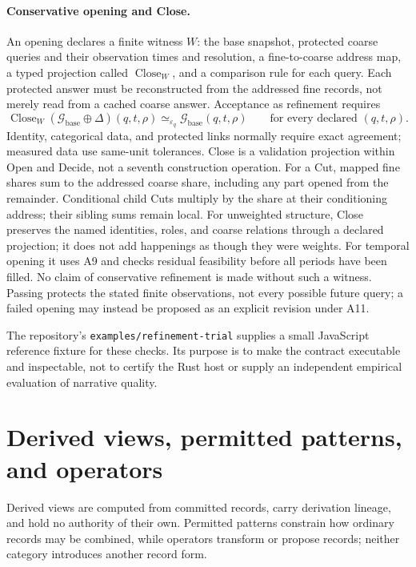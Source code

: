 \documentclass[11pt,a4paper]{article}
\begin{document}
\paragraph{Conservative opening and Close.}
An opening declares a finite witness $W$: the base snapshot, protected coarse
queries and their observation times and resolution, a fine-to-coarse address
map, a typed projection called $\operatorname{Close}_W$, and a comparison
rule for each query. Each protected answer must be reconstructed from the
addressed fine records, not merely read from a cached coarse answer.
Acceptance as refinement requires
\begin{equation}
  \operatorname{Close}_W(\mathcal G_{\mathrm{base}}\oplus\Delta)(q,t,\rho)
  \simeq_{\varepsilon_q}
  \mathcal G_{\mathrm{base}}(q,t,\rho)
  \qquad\text{for every declared }(q,t,\rho).
\end{equation}
Identity, categorical data, and protected links normally require exact
agreement; measured data use same-unit tolerances. Close is a validation
projection within Open and Decide, not a seventh construction operation.
For a Cut, mapped fine shares sum to the addressed coarse share, including
any part opened from the remainder. Conditional child Cuts multiply by the
share at their conditioning address; their sibling sums remain local.
For unweighted structure, Close preserves the named identities, roles, and
coarse relations through a declared projection; it does not add happenings as
though they were weights. For temporal opening it uses A9 and checks residual
feasibility before all periods have been filled. No claim of conservative
refinement is made without such a witness. Passing protects the stated
finite observations, not every possible future query; a failed opening may
instead be proposed as an explicit revision under A11.

The repository's \texttt{examples/refinement-trial} supplies a small
JavaScript reference fixture for these checks. Its purpose is to make the
contract executable and inspectable, not to certify the Rust host or supply
an independent empirical evaluation of narrative quality.

\section{Derived views, permitted patterns, and operators}

Derived views are computed from committed records, carry derivation lineage,
and hold no authority of their own. Permitted patterns constrain how ordinary
records may be combined, while operators transform or propose records; neither
category introduces another record form.
\end{document}
